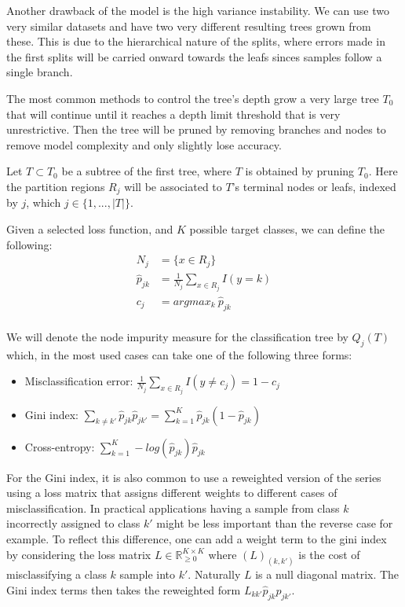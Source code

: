 Another drawback of the model is the high variance instability. We can use two very similar datasets and have two very different resulting trees grown from these. This is due to the hierarchical nature of the splits, where errors made in the first splits will be carried onward towards the leafs sinces samples follow a single branch.

The most common methods to control the tree's depth grow a very large tree $T_0$ that will continue until it reaches a depth limit threshold that is very unrestrictive. Then the tree will be pruned by removing branches and nodes to remove model complexity and only slightly lose accuracy. 

Let $T \subset T_0$ be a subtree of the first tree, where $T$ is obtained by pruning $T_0$.  Here the partition regions $R_j$ will be associated to $T$'s terminal nodes or leafs, indexed by $j$, which $j \in \{1,...,|T|  \}$. 

Given a selected loss function, and $K$ possible target classes, we can define the following:
\begin{equation}
\begin{split}
N_j & =  \{x \in R_j \}\\
\hat{p}_{jk} & = \frac{1}{N_j} \sum_{x \in R_j}  I(y=k)\\
c_j & =  argmax_{k} \  \hat{p}_{jk} \\
\end{split}
\end{equation}\label{decisionTreePruneParameters}

We will denote the node impurity measure for the classification tree by $Q_j(T)$ which, in the most used cases can take one of the following three forms:

\begin{itemize}
	\item Misclassification error: $ \displaystyle \frac{1}{N_j} \sum_{x \in R_j}  I(y\neq c_j)  = 1 - c_j $
	\item Gini index: $ \displaystyle \sum_{k\neq k'} \hat{p}_{jk} \hat{p}_{jk'}   = \sum_{k=1}^{K} \hat{p}_{jk} (1 - \hat{p}_{jk})  $
	\item Cross-entropy: $ \displaystyle \sum_{k=1}^{K} -log(\hat{p}_{jk})\hat{p}_{jk} $
\end{itemize}


For the Gini index, it is also common to use a reweighted version of the series using a loss matrix that assigns different weights to different cases of misclassification. In practical applications having a sample from class $k$ incorrectly assigned to class $k'$ might be less important than the reverse case for example. To reflect this difference, one can add a weight term to the gini index by considering the loss matrix $L \in \mathbb R_{\ge 0}^{K \times K}$ where $(L)_{(k,k')}$ is the cost of misclassifying a class $k$ sample into $k'$. Naturally $L$ is a null diagonal matrix.  The Gini index terms then takes the reweighted form  $L_{kk'} \hat{p}_{jk} \hat{p}_{jk'}$.


